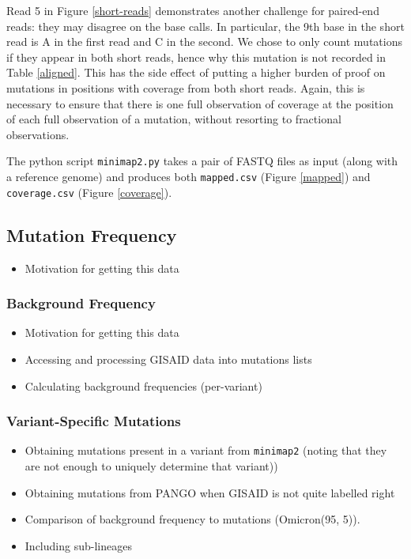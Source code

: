 \documentclass{article}
\newenvironment{tightemize}
{ \begin{itemize}
    \setlength{\itemsep}{0pt}
    \setlength{\parskip}{0pt}
    \setlength{\parsep}{0pt}     }
{ \end{itemize}                  }
\begin{document}
Read 5 in Figure \ref{short-reads} demonstrates another challenge for paired-end reads: they may disagree on the base calls.
In particular, the 9th base in the short read is A in the first read and C in the second.
We chose to only count mutations if they appear in both short reads, hence why this mutation is not recorded in Table \ref{aligned}.
This has the side effect of putting a higher burden of proof on mutations in positions with coverage from both short reads.
Again, this is necessary to ensure that there is one full observation of coverage at the position of each full observation of a mutation, without resorting to fractional observations.

The python script \texttt{minimap2.py} takes a pair of FASTQ files as input (along with a reference genome) and produces both \texttt{mapped.csv} (Figure \ref{mapped}) and \texttt{coverage.csv} (Figure \ref{coverage}).


\subsection{Mutation Frequency}


\begin{tightemize}
    \item Motivation for getting this data
\end{tightemize}

\subsubsection{Background Frequency}
\begin{tightemize}
    \item Motivation for getting this data
    \item Accessing and processing GISAID data into mutations lists
    \item Calculating background frequencies (per-variant)
\end{tightemize}

\subsubsection{Variant-Specific Mutations}

\begin{tightemize}
    \item Obtaining mutations present in a variant from \texttt{minimap2} (noting that they are not enough to uniquely determine that variant))
    \item Obtaining mutations from PANGO when GISAID is not quite labelled right
    \item Comparison of background frequency to mutations (Omicron(95, 5)). 
    \item Including sub-lineages
\end{tightemize}
\end{document}
